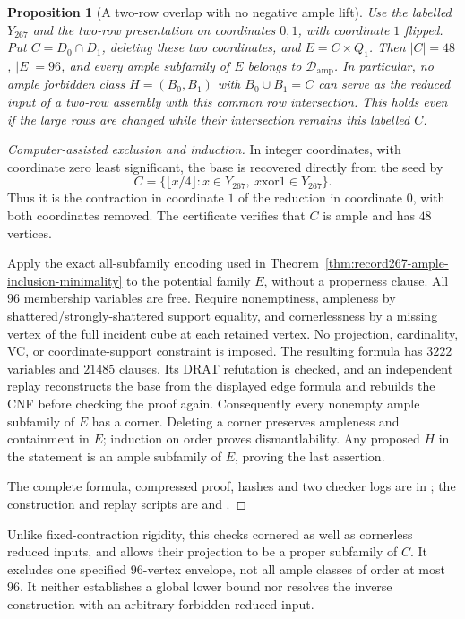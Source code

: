 \documentclass[11pt]{article}
\numberwithin{equation}{section}
\newtheorem{proposition}[theorem]{Proposition}
\theoremstyle{definition}
\theoremstyle{remark}
\newcommand{\Damp}{\mathcal D_{\mathrm{amp}}}
\begin{document}
\begin{proposition}[A two-row overlap with no negative ample lift]
\label{prop:record-two-row-overlap-envelope}
Use the labelled $Y_{267}$ and the two-row presentation on coordinates
$0,1$, with coordinate $1$ flipped. Put $C=D_0\cap D_1$, deleting
these two coordinates, and $E=C\times Q_1$. Then $|C|=48$, $|E|=96$,
and every ample subfamily of $E$ belongs to $\Damp$.
In particular, no ample forbidden class $H=(B_0,B_1)$ with
$B_0\cup B_1=C$ can serve as the reduced input of a two-row assembly
with this common row intersection. This holds even if the large rows
are changed while their intersection remains this labelled $C$.
\end{proposition}
\begin{proof}[Computer-assisted exclusion and induction]
In integer coordinates, with coordinate zero least significant, the
base is recovered directly from the seed by
\[
 C=\{\lfloor x/4\rfloor:x\in Y_{267},\ x\mathbin{\mathrm{xor}}1\in Y_{267}\}.
\]
Thus it is the contraction in coordinate $1$ of the reduction in
coordinate $0$, with both coordinates removed. The certificate verifies
that $C$ is ample and has $48$ vertices.

Apply the exact all-subfamily encoding used in
Theorem~\ref{thm:record267-ample-inclusion-minimality} to the potential
family $E$, without a properness clause. All $96$ membership variables
are free. Require nonemptiness, ampleness by shattered/strongly-shattered
support equality, and cornerlessness by a missing vertex of the full
incident cube at each retained vertex. No projection, cardinality, VC,
or coordinate-support constraint is imposed. The resulting formula has
$3222$ variables and $21485$ clauses. Its DRAT refutation is checked,
and an independent replay reconstructs the base from the displayed
edge formula and rebuilds the CNF before checking the proof again.
Consequently every nonempty ample subfamily of $E$ has a corner.
Deleting a corner preserves ampleness and containment in $E$; induction
on order proves dismantlability. Any proposed $H$ in the statement is
an ample subfamily of $E$, proving the last assertion.

The complete formula, compressed proof, hashes and two checker logs
are in ; the construction and
replay scripts are 
and .
\end{proof}

Unlike fixed-contraction rigidity, this checks cornered as well as
cornerless reduced inputs, and allows their projection to be a proper
subfamily of $C$. It excludes one specified $96$-vertex envelope,
not all ample classes of order at most $96$. It neither establishes
a global lower bound nor resolves the inverse construction with an
arbitrary forbidden reduced input.
\end{document}
